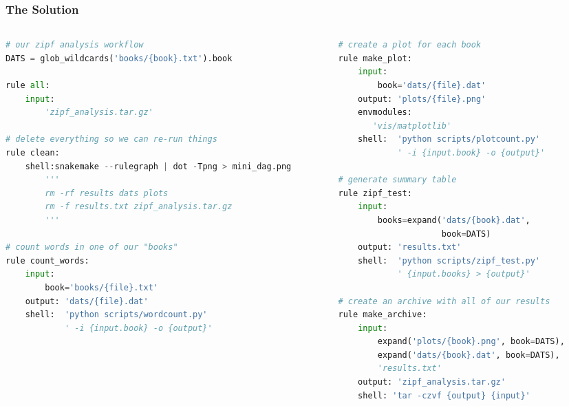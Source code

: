 \begin{frame}[fragile]
  \frametitle{The Solution}
  \begin{columns}
    \begin{column}{0.5\textwidth}
     \begin{lstlisting}[language=Python,style=Python,basicstyle=\tiny]
# our zipf analysis workflow
DATS = glob_wildcards('books/{book}.txt').book

rule all:
    input:
        'zipf_analysis.tar.gz'

# delete everything so we can re-run things
rule clean:
    shell:snakemake --rulegraph | dot -Tpng > mini_dag.png
        '''
        rm -rf results dats plots
        rm -f results.txt zipf_analysis.tar.gz
        '''

# count words in one of our "books"
rule count_words:
    input:
        book='books/{file}.txt'
    output: 'dats/{file}.dat'
    shell:  'python scripts/wordcount.py'
            ' -i {input.book} -o {output}'
    \end{lstlisting}
    \end{column}
    \begin{column}{0.5\textwidth}
      \begin{lstlisting}[language=Python,style=Python,basicstyle=\tiny]
# create a plot for each book
rule make_plot:
    input:
        book='dats/{file}.dat'
    output: 'plots/{file}.png'
    envmodules:
       'vis/matplotlib'
    shell:  'python scripts/plotcount.py'
            ' -i {input.book} -o {output}'

# generate summary table
rule zipf_test:
    input:
        books=expand('dats/{book}.dat', 
                     book=DATS)
    output: 'results.txt'
    shell:  'python scripts/zipf_test.py'
            ' {input.books} > {output}'

# create an archive with all of our results
rule make_archive:
    input:
        expand('plots/{book}.png', book=DATS),
        expand('dats/{book}.dat', book=DATS),
        'results.txt'
    output: 'zipf_analysis.tar.gz'
    shell: 'tar -czvf {output} {input}'
      \end{lstlisting}
    \end{column}
  \end{columns}
\end{frame}

